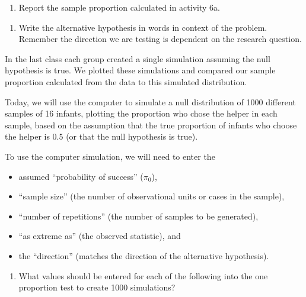 \documentclass[
]{report}
\providecommand{\tightlist}{%
  \setlength{\itemsep}{0pt}\setlength{\parskip}{0pt}}
\begin{document}
\begin{enumerate}
\def\labelenumi{\arabic{enumi}.}
\tightlist
\item
  Report the sample proportion calculated in activity 6a.
\end{enumerate}

\vspace{0.5in}

\begin{enumerate}
\def\labelenumi{\arabic{enumi}.}
\setcounter{enumi}{1}
\tightlist
\item
  Write the alternative hypothesis in words in context of the problem. Remember the direction we are testing is dependent on the research question.
\end{enumerate}

\vspace{0.8in}

In the last class each group created a single simulation assuming the null hypothesis is true. We plotted these simulations and compared our sample proportion calculated from the data to this simulated distribution.

Today, we will use the computer to simulate a null distribution of 1000 different samples of 16 infants, plotting the proportion who chose the helper in each sample, based on the assumption that the true proportion of infants who choose the helper is 0.5 (or that the null hypothesis is true).

To use the computer simulation, we will need to enter the

\begin{itemize}
\tightlist
\item
  assumed ``probability of success'' (\(\pi_0\)),
\item
  ``sample size'' (the number of observational units or cases in the sample),
\item
  ``number of repetitions'' (the number of samples to be generated),
\item
  ``as extreme as'' (the observed statistic), and
\item
  the ``direction'' (matches the direction of the alternative hypothesis).
\end{itemize}

\begin{enumerate}
\def\labelenumi{\arabic{enumi}.}
\setcounter{enumi}{2}
\tightlist
\item
  What values should be entered for each of the following into the one proportion test to create 1000 simulations?
\end{enumerate}
\end{document}
